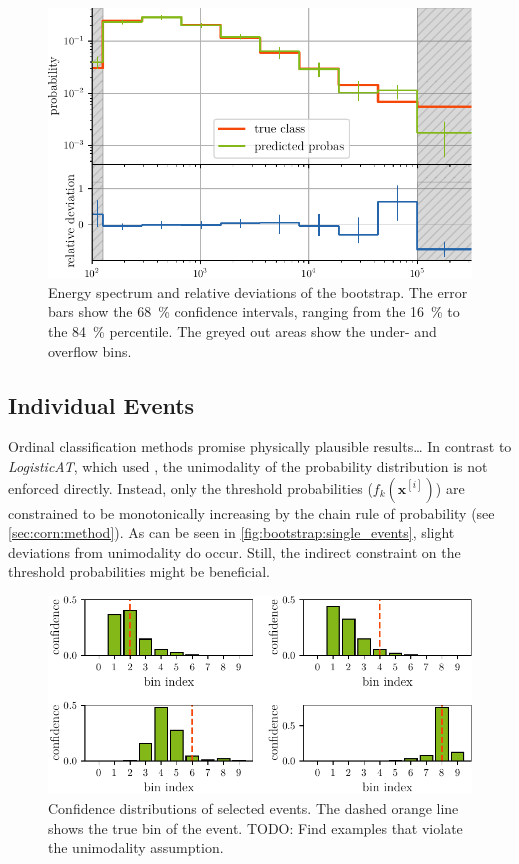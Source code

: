 
\begin{figure}
  \centering
  \includegraphics[scale=1]{content/plots/bootstrap:spectrum_full.pdf}
  \caption{
    Energy spectrum and relative deviations of the bootstrap.
    The error bars show the \SI{68}{\percent} confidence intervals,
    ranging from the \SI{16}{\percent} to the \SI{84}{\percent} percentile.
    The greyed out areas show the under- and overflow bins.
  }
  \label{fig:bootstrap:spectrum}
\end{figure}


\subsection{Individual Events}
Ordinal classification methods promise physically plausible results… %
In contrast to \emph{LogisticAT},
    which \citeauthor{dsea_jan} used \cite{dsea_jan},
  the unimodality of the probability distribution is not enforced directly.
Instead,
  only the threshold probabilities ($f_k(\mathbf{x}^{[i]})$) are constrained to be monotonically increasing
  by the chain rule of probability
  (see \autoref{sec:corn:method}).
As can be seen in \autoref{fig:bootstrap:single_events},
  slight deviations from unimodality do occur.
Still,
  the indirect constraint on the threshold probabilities
  might be beneficial.

\begin{figure}
  \centering
  \includegraphics[scale=1]{content/plots/single_events_lessheight.pdf}
  \caption{
    Confidence distributions of selected events.
    The dashed orange line shows the true bin of the event.
    TODO: Find examples that violate the unimodality assumption.
  }
  \label{fig:bootstrap:single_events}
\end{figure}

